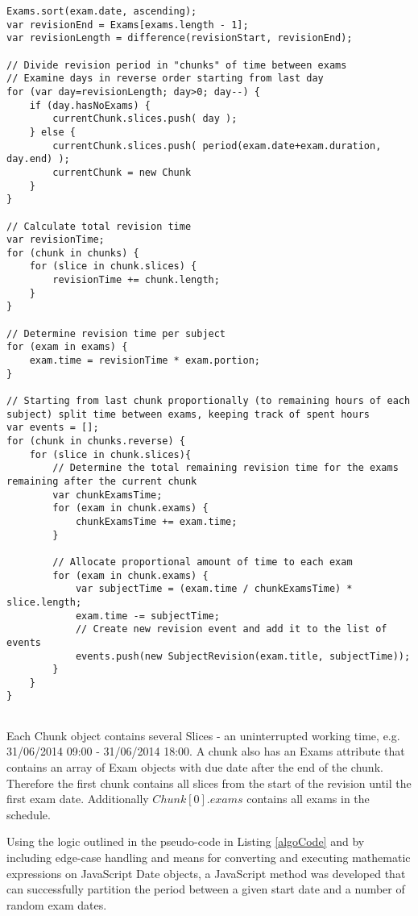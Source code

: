 \documentclass[bsc,frontabs,twoside,singlespacing,parskip]{infthesis}     %
\begin{document}
	\begin{lstlisting}[caption="SmartRevise scheduling algorithm", label=algoCode]
Exams.sort(exam.date, ascending);
var revisionEnd = Exams[exams.length - 1];
var revisionLength = difference(revisionStart, revisionEnd);

// Divide revision period in "chunks" of time between exams
// Examine days in reverse order starting from last day
for (var day=revisionLength; day>0; day--) {
	if (day.hasNoExams) {
		currentChunk.slices.push( day );
	} else {
		currentChunk.slices.push( period(exam.date+exam.duration, day.end) );
		currentChunk = new Chunk
	}
}

// Calculate total revision time
var revisionTime;
for (chunk in chunks) {
	for (slice in chunk.slices) {
		revisionTime += chunk.length;
	}
}

// Determine revision time per subject
for (exam in exams) {
	exam.time = revisionTime * exam.portion;
}

// Starting from last chunk proportionally (to remaining hours of each subject) split time between exams, keeping track of spent hours
var events = [];
for (chunk in chunks.reverse) {
	for (slice in chunk.slices){
		// Determine the total remaining revision time for the exams remaining after the current chunk
		var chunkExamsTime;
		for (exam in chunk.exams) {
			chunkExamsTime += exam.time;
		}
		
		// Allocate proportional amount of time to each exam
		for (exam in chunk.exams) {
			var subjectTime = (exam.time / chunkExamsTime) * slice.length;
			exam.time -= subjectTime;
			// Create new revision event and add it to the list of events
			events.push(new SubjectRevision(exam.title, subjectTime));
		}
	}
}
		
	\end{lstlisting}
	
	
		Each Chunk object contains several Slices - an uninterrupted working time, e.g. 31/06/2014 09:00 - 31/06/2014 18:00. A chunk also has an Exams attribute that contains an array of Exam objects with due date after the end of the chunk. Therefore the first chunk contains all slices from the start of the revision until the first exam date. Additionally $ Chunk[0].exams $ contains all exams in the schedule. 
	
		Using the logic outlined in the pseudo-code in Listing \ref{algoCode} and by including edge-case handling and means for converting and executing mathematic expressions on JavaScript Date objects, a JavaScript method was developed that can successfully partition the period between a given start date and a number of random exam dates.
	
\end{document}
